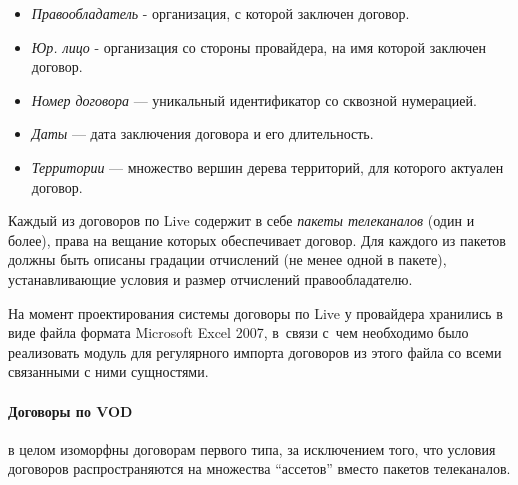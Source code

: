\begin{itemize}
\item{
  \textit{Правообладатель} - организация, с которой заключен договор.
}
\item{
  \textit{Юр. лицо} -  организация со стороны провайдера, на имя которой заключен договор.
}
\item{
  \textit{Номер договора} ---  уникальный идентификатор со сквозной нумерацией.
}
\item{
  \textit{Даты} --- дата заключения договора и его длительность.
}
\item{
  \textit{Территории} --- множество вершин дерева территорий, для которого актуален договор.
}
\end{itemize}

Каждый из договоров по Live содержит в себе \textit{пакеты телеканалов} (один и более), права на вещание которых обеспечивает договор.
Для каждого из пакетов должны быть описаны градации отчислений (не менее одной в пакете), устанавливающие условия и размер
отчислений правообладателю.

На момент проектирования системы договоры по Live у провайдера хранились в виде файла формата Microsoft Excel 2007, в~связи с~чем
необходимо было реализовать модуль для регулярного импорта договоров из этого файла со всеми связанными с ними сущностями.

\paragraph{Договоры по VOD} в целом изоморфны договорам первого типа, за исключением того, что условия договоров распространяются на множества ``ассетов''
вместо пакетов телеканалов.


